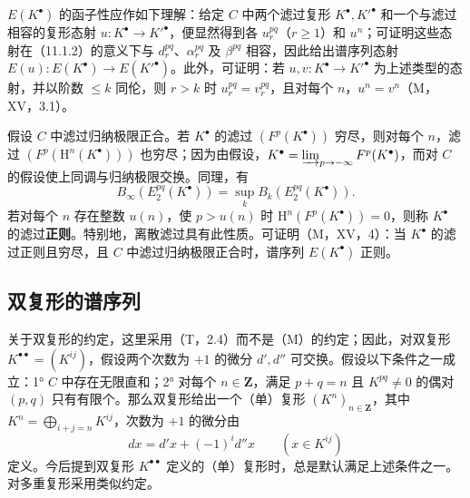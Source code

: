 $E(K^\bullet)$ 的函子性应作如下理解：给定 $C$ 中两个滤过复形 $K^\bullet,K'^\bullet$ 和一个与滤过相容的复形态射 $u:K^\bullet\to K'^\bullet$，便显然得到各 $u_r^{pq}$（$r\geq1$）和 $u^n$；可证明这些态射在（11.1.2）的意义下与 $d_r^{pq}$、$\alpha_r^{pq}$ 及 $\beta^{pq}$ 相容，因此给出谱序列态射 $E(u):E(K^\bullet)\to E(K'^\bullet)$。此外，可证明：若 $u,v:K^\bullet\to K'^\bullet$ 为上述类型的态射，并以阶数 $\leq k$ 同伦，则 $r>k$ 时 $u_r^{pq}=v_r^{pq}$，且对每个 $n$，$u^n=v^n$（M，XV，3.1）。

假设 $C$ 中滤过归纳极限正合。若 $K^\bullet$ 的滤过 $(F^p(K^\bullet))$ 穷尽，则对每个 $n$，滤过 $(F^p(\mathrm H^n(K^\bullet)))$ 也穷尽；因为由假设，$K^\bullet=\varinjlim_{p\to-\infty}F^p(K^\bullet)$，而对 $C$ 的假设使上同调与归纳极限交换。同理，有
\[
B_\infty(E_2^{pq}(K^\bullet))=\sup_k B_k(E_2^{pq}(K^\bullet)).
\]
若对每个 $n$ 存在整数 $u(n)$，使 $p>u(n)$ 时 $\mathrm H^n(F^p(K^\bullet))=0$，则称 $K^\bullet$ 的滤过\textbf{正则}。特别地，离散滤过具有此性质。可证明（M，XV，4）：当 $K^\bullet$ 的滤过正则且穷尽，且 $C$ 中滤过归纳极限正合时，谱序列 $E(K^\bullet)$ 正则。

\subsection{双复形的谱序列}
关于双复形的约定，这里采用（T，2.4）而不是（M）的约定；因此，对双复形 $K^{\bullet\bullet}=(K^{ij})$，假设两个次数为 $+1$ 的微分 $d',d''$ 可交换。假设以下条件之一成立：1° $C$ 中存在无限直和；2° 对每个 $n\in\mathbf Z$，满足 $p+q=n$ 且 $K^{pq}\ne0$ 的偶对 $(p,q)$ 只有有限个。那么双复形给出一个（单）复形 $(K^n)_{n\in\mathbf Z}$，其中 $K^n=\bigoplus_{i+j=n}K^{ij}$，次数为 $+1$ 的微分由
\[
dx=d'x+(-1)^i d''x\qquad(x\in K^{ij})
\]
定义。今后提到双复形 $K^{\bullet\bullet}$ 定义的（单）复形时，总是默认满足上述条件之一。对多重复形采用类似约定。


